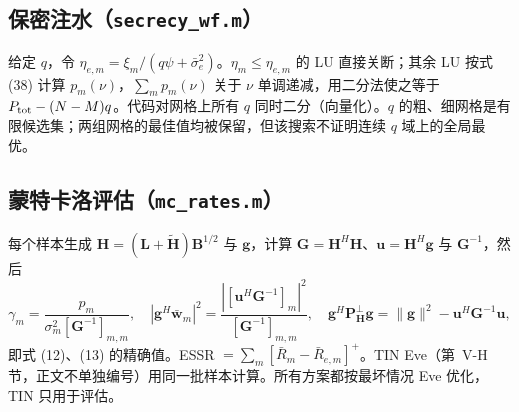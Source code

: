\documentclass[11pt,a4paper]{ctexart}
\newcommand{\code}[1]{\texttt{#1}}
\newcommand{\Ptot}{P_{\rm tot}}
\begin{document}
\subsection{保密注水（\code{secrecy\_wf.m}）}
给定 $q$，令 $\eta_{e,m}=\xi_m/(q\psi+\bar\sigma_e^2)$。$\eta_m\le\eta_{e,m}$ 的 LU 直接关断；其余 LU 按式 (38) 计算 $p_m(\nu)$，$\sum_mp_m(\nu)$ 关于 $\nu$ 单调递减，用二分法使之等于 $\Ptot-(N-M)q$。代码对网格上所有 $q$ 同时二分（向量化）。$q$ 的粗、细网格是有限候选集；两组网格的最佳值均被保留，但该搜索不证明连续 $q$ 域上的全局最优。

\subsection{蒙特卡洛评估（\code{mc\_rates.m}）}
每个样本生成 $\mathbf H=(\mathbf L+\tilde{\mathbf H})\mathbf B^{1/2}$ 与 $\mathbf g$，计算 $\mathbf G=\mathbf H^H\mathbf H$、$\mathbf u=\mathbf H^H\mathbf g$ 与 $\mathbf G^{-1}$，然后
\[
\gamma_m=\frac{p_m}{\sigma_m^2[\mathbf G^{-1}]_{m,m}},\quad
|\mathbf g^H\bar{\mathbf w}_m|^2=\frac{|[\mathbf u^H\mathbf G^{-1}]_m|^2}{[\mathbf G^{-1}]_{m,m}},\quad
\mathbf g^H\mathbf P_{\mathbf H}^\perp\mathbf g=\|\mathbf g\|^2-\mathbf u^H\mathbf G^{-1}\mathbf u,
\]
即式 (12)、(13) 的精确值。ESSR $=\sum_m[\bar R_m-\bar R_{e,m}]^+$。TIN Eve（第~V-H 节，正文不单独编号）用同一批样本计算。所有方案都按最坏情况 Eve 优化，TIN 只用于评估。

\end{document}
